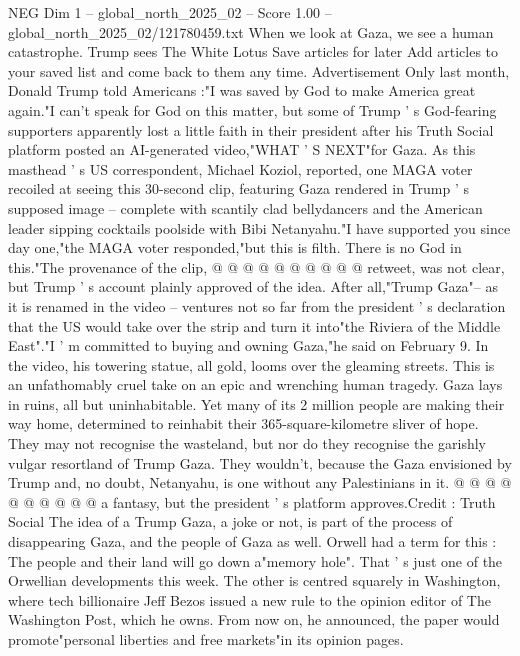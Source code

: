 \begin{textsample}{NEG Dim 1 – global\_north\_2025\_02 – Score 1.00 – global\_north\_2025\_02/121780459.txt}  \label{ex:f1_neg_015}
When we look at Gaza, we see a human catastrophe.
Trump sees The White Lotus Save articles for later Add articles to your saved list and come back to them any time.
Advertisement Only last month, Donald Trump told Americans :"I was saved by God to make America great again."I can't speak for God on this matter, but some of Trump ' s God-fearing supporters apparently lost a little faith in their president after his Truth Social platform posted an AI-generated video,"WHAT ' S NEXT"for Gaza.
As this masthead ' s US correspondent, Michael Koziol, reported, one MAGA voter recoiled at seeing this 30-second clip, featuring Gaza rendered in Trump ' s supposed image -- complete with scantily clad bellydancers and the American leader sipping cocktails poolside with Bibi Netanyahu."I have supported you since day one,"the MAGA voter responded,"but this is filth.
There is no God in this."The provenance of the clip, @ @ @ @ @ @ @ @ @ @ retweet, was not clear, but Trump ' s account plainly approved of the idea.
After all,"Trump Gaza"-- as it is renamed in the video -- ventures not so far from the president ' s declaration that the US would take over the strip and turn it into"the Riviera of the Middle East"."I ' m committed to buying and owning Gaza,"he said on February 9.
In the video, his towering statue, all gold, looms over the gleaming streets.
This is an unfathomably cruel take on an epic and wrenching human tragedy.
Gaza lays in ruins, all but uninhabitable.
Yet many of its 2 million people are making their way home, determined to reinhabit their 365-square-kilometre sliver of hope.
They may not recognise the wasteland, but nor do they recognise the garishly vulgar resortland of Trump Gaza.
They wouldn't, because the Gaza envisioned by Trump and, no doubt, Netanyahu, is one without any Palestinians in it. @ @ @ @ @ @ @ @ @ @ a fantasy, but the president ' s platform approves.Credit : Truth Social The idea of a Trump Gaza, a joke or not, is part of the process of disappearing Gaza, and the people of Gaza as well.
Orwell had a term for this : The people and their land will go down a"memory hole".
That ' s just one of the Orwellian developments this week.
The other is centred squarely in Washington, where tech billionaire Jeff Bezos issued a new rule to the opinion editor of The Washington Post, which he owns.
From now on, he announced, the paper would promote"personal liberties and free markets"in its opinion pages.

\end{textsample}
